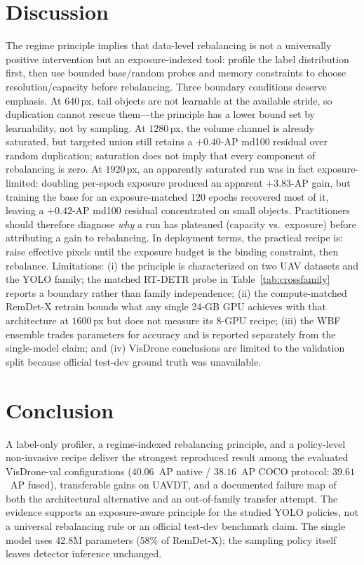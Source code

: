 \documentclass[journal]{IEEEtran}
\newcommand{\ap}{\ensuremath{\mathrm{AP}}}
\newcommand{\remdet}{RemDet-X}
\newcommand{\uavdt}{UAVDT}
\begin{document}
\section{Discussion}
The regime principle implies that data-level rebalancing is not a universally positive intervention but an exposure-indexed tool: profile the label distribution first, then use bounded base/random probes and memory constraints to choose resolution/capacity before rebalancing. Three boundary conditions deserve emphasis. At 640\,px, tail objects are not learnable at the available stride, so duplication cannot rescue them---the principle has a lower bound set by learnability, not by sampling. At $1280$\,px, the volume channel is already saturated, but targeted union still retains a $+0.40$-\ap{} md100 residual over random duplication; saturation does not imply that every component of rebalancing is zero. At $1920$\,px, an apparently saturated run was in fact exposure-limited: doubling per-epoch exposure produced an apparent $+3.83$-\ap{} gain, but training the base for an exposure-matched 120 epochs recovered most of it, leaving a $+0.42$-\ap{} md100 residual concentrated on small objects. Practitioners should therefore diagnose \emph{why} a run has plateaued (capacity vs.\ exposure) before attributing a gain to rebalancing. In deployment terms, the practical recipe is: raise effective pixels until the exposure budget is the binding constraint, then rebalance. Limitations: (i) the principle is characterized on two UAV datasets and the YOLO family; the matched RT-DETR probe in Table~\ref{tab:crossfamily} reports a boundary rather than family independence; (ii) the compute-matched \remdet{} retrain bounds what any single 24-GB GPU achieves with that architecture at $1600$\,px but does not measure its 8-GPU recipe; (iii) the WBF ensemble trades parameters for accuracy and is reported separately from the single-model claim; and (iv) VisDrone conclusions are limited to the validation split because official test-dev ground truth was unavailable.

\section{Conclusion}
A label-only profiler, a regime-indexed rebalancing principle, and a policy-level non-invasive recipe deliver the strongest reproduced result among the evaluated VisDrone-val configurations ($40.06$~\ap{} native / $38.16$~\ap{} COCO protocol; $39.61$~\ap{} fused), transferable gains on \uavdt{}, and a documented failure map of both the architectural alternative and an out-of-family transfer attempt. The evidence supports an exposure-aware principle for the studied YOLO policies, not a universal rebalancing rule or an official test-dev benchmark claim. The single model uses 42.8M parameters (58\% of \remdet{}); the sampling policy itself leaves detector inference unchanged.
\end{document}
